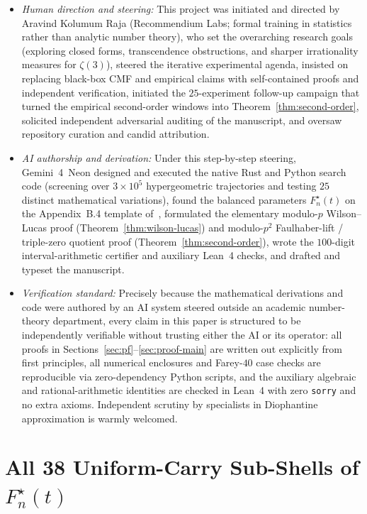 \documentclass[11pt,reqno]{amsart}
\theoremstyle{definition}
\theoremstyle{remark}
\begin{document}
\begin{itemize}
  \item \emph{Human direction and steering:} This project was initiated and directed by Aravind Kolumum Raja (Recommendium Labs; formal training in statistics rather than analytic number theory), who set the overarching research goals (exploring closed forms, transcendence obstructions, and sharper irrationality measures for $\zeta(3)$), steered the iterative experimental agenda, insisted on replacing black-box CMF and empirical claims with self-contained proofs and independent verification, initiated the $25$-experiment follow-up campaign that turned the empirical second-order windows into Theorem~\ref{thm:second-order}, solicited independent adversarial auditing of the manuscript, and oversaw repository curation and candid attribution.
  \item \emph{AI authorship and derivation:} Under this step-by-step steering, Gemini~4~Neon designed and executed the native Rust and Python search code (screening over $3 \times 10^5$ hypergeometric trajectories and testing $25$ distinct mathematical variations), found the balanced parameters $F_n^{\star}(t)$ on the Appendix~B.4 template of~\cite{LeibtagKaminer2026}, formulated the elementary modulo-$p$ Wilson--Lucas proof (Theorem~\ref{thm:wilson-lucas}) and modulo-$p^2$ Faulhaber-lift / triple-zero quotient proof (Theorem~\ref{thm:second-order}), wrote the $100$-digit interval-arithmetic certifier and auxiliary Lean~4 checks, and drafted and typeset the manuscript.
  \item \emph{Verification standard:} Precisely because the mathematical derivations and code were authored by an AI system steered outside an academic number-theory department, every claim in this paper is structured to be independently verifiable without trusting either the AI or its operator: all proofs in Sections~\ref{sec:pf}--\ref{sec:proof-main} are written out explicitly from first principles, all numerical enclosures and Farey-$40$ case checks are reproducible via zero-dependency Python scripts, and the auxiliary algebraic and rational-arithmetic identities are checked in Lean~4 with zero \texttt{sorry} and no extra axioms. Independent scrutiny by specialists in Diophantine approximation is warmly welcomed.
\end{itemize}

\clearpage
\appendix
\section{All 38 Uniform-Carry Sub-Shells of \texorpdfstring{$F_n^{\star}(t)$}{F\_n*(t)}}
\label{app:subshells}
\end{document}
